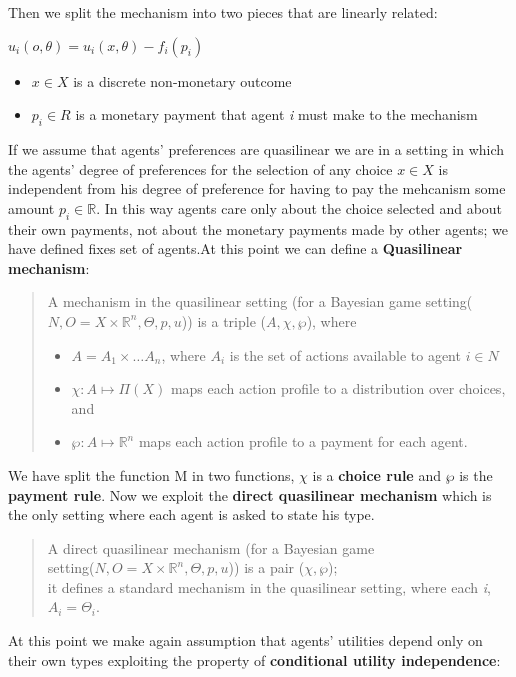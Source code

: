 \documentclass{article}
\begin{document}
{Then we split the mechanism into two pieces that are linearly related:
\begin{center}
    $u_i(o,\theta) = u_i(x,\theta) - f_i(p_i)$
    \begin{itemize}
        \item $x \in X$ is a discrete non-monetary outcome
        \item $p_i \in R$ is a monetary payment that agent \textit{i} must make to the mechanism
    \end{itemize}
\end{center}
If we assume that agents' preferences are quasilinear we are in a setting in which the agents' degree of preferences for the selection of any choice $x \in X$ is independent from his degree of preference for having to pay the mehcanism some amount $p_i \in \mathbb{R}$. In this way agents care only about the choice selected and about their own payments, not about the monetary payments made by other agents; we have defined fixes set of agents.\newpage At this point we can define a \textbf{Quasilinear mechanism}:
\begin{quote}
    A mechanism in the quasilinear setting (for a Bayesian game setting($N,O = X \times \mathbb{R}^n,\Theta,p,u$)) is a triple ($A,\chi,\wp$), where
    \begin{itemize}
        \item $A = A_1 \times \dots A_n$, where $A_i$ is the set of actions available to agent $i \in N$
        \item $\chi : A \mapsto \Pi(X)$ maps each action profile to a distribution over choices, and
        \item $\wp : A \mapsto \mathbb{R}^n$ maps each action profile to a payment for each agent.
    \end{itemize}
\end{quote}
We have split the function M in two functions, $\chi$ is a \textbf{choice rule} and $\wp$ is the \textbf{payment rule}. Now we exploit the \textbf{direct quasilinear mechanism} which is the only setting where each agent is asked to state his type.
\begin{quote}
    A direct quasilinear mechanism (for a Bayesian game\\ setting($N,O = X \times \mathbb{R}^n,\Theta,p,u$)) is a pair ($\chi,\wp$);\\ it defines a standard mechanism in the quasilinear setting, where each \textit{i}, $A_i = \Theta_i$.
\end{quote}
At this point we make again assumption that agents' utilities depend only on their own types exploiting the property of \textbf{conditional utility independence}:
}
\end{document}
